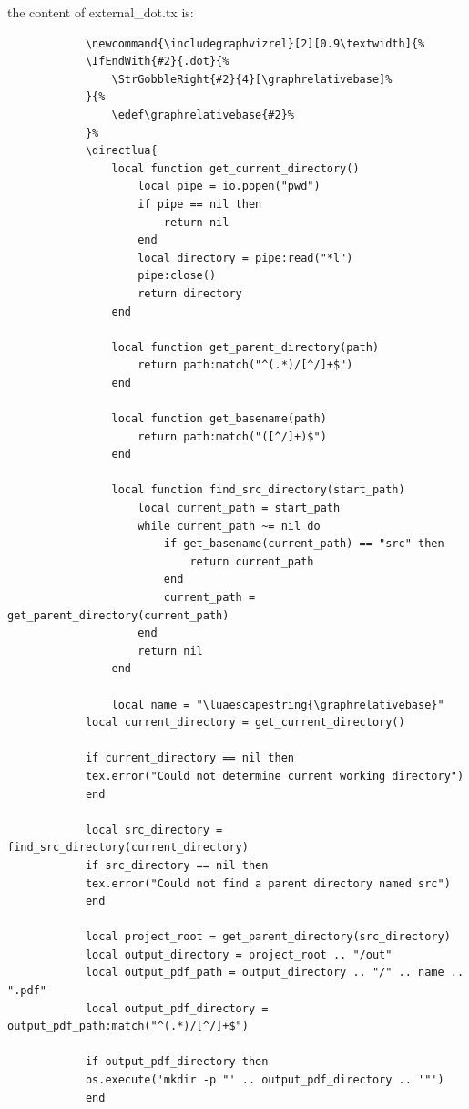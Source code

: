 \documentclass[a4paper]{article}
\begin{document}
        the content of external\_dot.tx is:
        \begin{verbatim}
            \newcommand{\includegraphvizrel}[2][0.9\textwidth]{%
            \IfEndWith{#2}{.dot}{%
                \StrGobbleRight{#2}{4}[\graphrelativebase]%
            }{%
                \edef\graphrelativebase{#2}%
            }%
            \directlua{
                local function get_current_directory()
                    local pipe = io.popen("pwd")
                    if pipe == nil then
                        return nil
                    end
                    local directory = pipe:read("*l")
                    pipe:close()
                    return directory
                end
        
                local function get_parent_directory(path)
                    return path:match("^(.*)/[^/]+$")
                end
        
                local function get_basename(path)
                    return path:match("([^/]+)$")
                end
        
                local function find_src_directory(start_path)
                    local current_path = start_path
                    while current_path ~= nil do
                        if get_basename(current_path) == "src" then
                            return current_path
                        end
                        current_path = get_parent_directory(current_path)
                    end
                    return nil
                end
        
                local name = "\luaescapestring{\graphrelativebase}"
            local current_directory = get_current_directory()
            
            if current_directory == nil then
            tex.error("Could not determine current working directory")
            end
            
            local src_directory = find_src_directory(current_directory)
            if src_directory == nil then
            tex.error("Could not find a parent directory named src")
            end
            
            local project_root = get_parent_directory(src_directory)
            local output_directory = project_root .. "/out"
            local output_pdf_path = output_directory .. "/" .. name .. ".pdf"
            local output_pdf_directory = output_pdf_path:match("^(.*)/[^/]+$")
            
            if output_pdf_directory then
            os.execute('mkdir -p "' .. output_pdf_directory .. '"')
            end
            

\end{verbatim}
\end{document}

